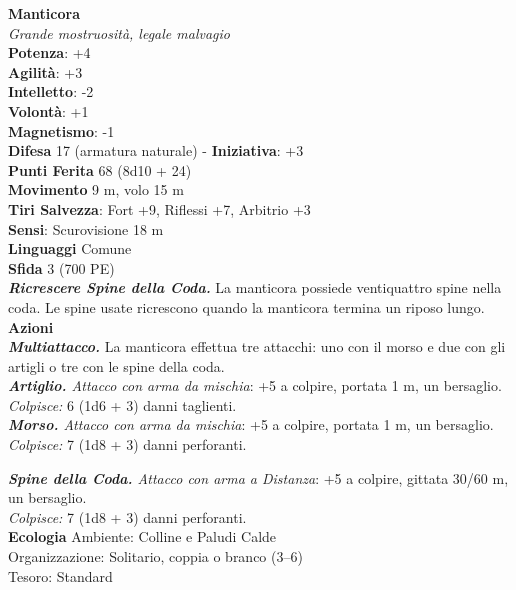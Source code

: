 \begin{multicols}{2}
\medskip\textbf{Manticora}\\
\emph{Grande mostruosità, legale malvagio}\\
\textbf{Potenza}: +4\\
\textbf{Agilità}: +3\\
\textbf{Intelletto}: -2\\
\textbf{Volontà}: +1\\
\textbf{Magnetismo}: -1\\
\textbf{Difesa} 17 (armatura naturale) - \textbf{Iniziativa}: +3\\
\textbf{Punti Ferita} 68 (8d10 + 24)\\
\textbf{Movimento} 9 m, volo 15 m\\
\textbf{Tiri Salvezza}: Fort +9, Riflessi +7, Arbitrio +3\\
\textbf{Sensi}: Scurovisione 18 m\\
\textbf{Linguaggi} Comune\\
\textbf{Sfida} 3 (700 PE)\smallskip\\
\emph{\textbf{Ricrescere Spine della Coda.}} La manticora possiede ventiquattro spine nella coda. Le spine usate ricrescono quando la manticora termina un riposo lungo.\\

\smallskip\textbf{Azioni}\\

\emph{\textbf{Multiattacco.}} La manticora effettua tre attacchi: uno con il morso e due con gli artigli o tre con le spine della coda.\\

\emph{\textbf{Artiglio.} Attacco con arma da mischia}: +5 a colpire, portata 1 m, un bersaglio.\\

\emph{Colpisce:} 6 (1d6 + 3) danni taglienti.\\

\emph{\textbf{Morso.} Attacco con arma da mischia}: +5 a colpire, portata 1 m, un bersaglio.\\

\emph{Colpisce:} 7 (1d8 + 3) danni perforanti.

\emph{\textbf{Spine della Coda.} Attacco con arma a Distanza}: +5 a colpire, gittata 30/60 m, un bersaglio.\\

\emph{Colpisce:} 7 (1d8 + 3) danni perforanti.\\
\textbf{Ecologia}
Ambiente: Colline e Paludi Calde\\
Organizzazione: Solitario, coppia o branco (3–6)\\
Tesoro: Standard\\


\end{multicols}
